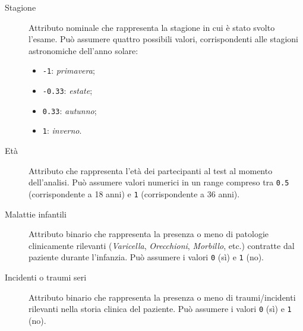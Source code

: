 \documentclass[a4paper,11pt,twoside,notitlepage,final]{scrartcl}
\begin{document}
\begin{description}
  \item[Stagione]
    Attributo nominale che rappresenta la stagione in cui è stato svolto l'esame.
    Può assumere quattro possibili valori, corrispondenti alle stagioni astronomiche dell'anno solare:
    \begin{itemize}
      \item \texttt{-1}: \emph{primavera};
      \item \texttt{-0.33}: \emph{estate};
      \item \texttt{0.33}: \emph{autunno};
      \item \texttt{1}: \emph{inverno}.
    \end{itemize}
  \item[Età]
    Attributo che rappresenta l'età dei partecipanti al test al momento dell'analisi.
    Può assumere valori numerici in un range compreso tra \texttt{0.5} (corrispondente a 18 anni) e \texttt{1} (corrispondente a 36 anni).
  \item[Malattie infantili]
    Attributo binario che rappresenta la presenza o meno di patologie clinicamente rilevanti (\emph{Varicella}, \emph{Orecchioni}, \emph{Morbillo}, etc.) contratte dal paziente durante l'infanzia.
    Può assumere i valori \texttt{0} (sì) e \texttt{1} (no).
  \item[Incidenti o traumi seri]
    Attributo binario che rappresenta la presenza o meno di traumi/incidenti rilevanti nella storia clinica del paziente.
    Può assumere i valori \texttt{0} (sì) e \texttt{1} (no).

\end{description}
\end{document}
